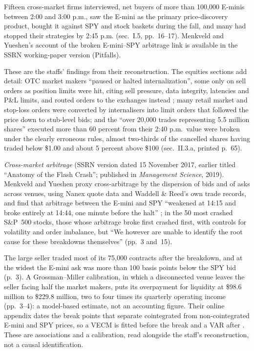 \begin{qfevidence}
Fifteen cross-market firms interviewed, net buyers of more than 100{,}000 E-minis between 2:00 and 3:00 p.m., saw the E-mini as the primary price-discovery product, bought it against SPY and stock baskets during the fall, and many had stopped their strategies by 2:45 p.m. (sec.~I.5, pp.~16--17). Menkveld and Yueshen's account of the broken E-mini--SPY arbitrage link is available in the SSRN working-paper version (Pitfalls).

 These are the staffs' findings from their reconstruction. The equities sections add detail: OTC market makers ``paused or halted internalization'', some only on sell orders as position limits were hit, citing sell pressure, data integrity, latencies and P\&L limits, and routed orders to the exchanges instead \citep[sec.~II.2.e, printed p.~58]{sec-cftc-may6-2010}; many retail market and stop-loss orders were converted by internalisers into limit orders that followed the price down to stub-level bids; and the ``over 20{,}000 trades representing 5.5 million shares'' executed more than 60 percent from their 2:40 p.m.\ value were broken under the clearly erroneous rules, almost two-thirds of the cancelled shares having traded below \$1.00 and about 5 percent above \$100 (sec.~II.3.a, printed p.~65).

\emph{Cross-market arbitrage} (SSRN version dated 15 November 2017, earlier titled ``Anatomy of the Flash Crash''; published in \emph{Management Science}, 2019). Menkveld and Yueshen proxy cross-arbitrage by the dispersion of bids and of asks across venues, using Nanex quote data and Waddell \& Reed's own trade records, and find that arbitrage between the E-mini and SPY ``weakened at 14:15 and broke entirely at 14:44, one minute before the halt'' \citep[SSRN version, printed pp.~2--3 and~5--7]{w5-menkveld-yueshen-flash}; in the 50 most crashed S\&P~500 stocks, those whose arbitrage broke first crashed first, with controls for volatility and order imbalance, but ``We however are unable to identify the root cause for these breakdowns themselves'' (pp.~3 and~15).

The large seller traded most of its 75,000 contracts after the breakdown, and at the widest the E-mini ask was more than 100 basis points below the SPY bid (p.~3). A Grossman--Miller calibration, in which a disconnected venue leaves the seller facing half the market makers, puts its overpayment for liquidity at \$98.6 million to \$229.8 million, two to four times its quarterly operating income (pp.~3--4): a model-based estimate, not an accounting figure. Their online appendix dates the break points that separate cointegrated from non-cointegrated E-mini and SPY prices, so a VECM is fitted before the break and a VAR after \citep[secs.~A--B]{menkveld-yueshen-oa}. These are associations and a calibration, read alongside the staff's reconstruction, not a causal identification.


\end{qfevidence}
